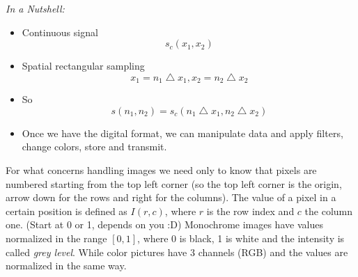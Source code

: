 \textit{In a Nutshell:}
\begin{itemize}
    \item Continuous signal \[ s_c(x_1, x_2)\]
    \item Spatial rectangular sampling \[ x_1 = n_1 \bigtriangleup x_1, x_2 = n_2 \bigtriangleup x_2\]
    \item So \[ s(n_1, n_2) = s_c(n_1 \bigtriangleup x_1, n_2 \bigtriangleup x_2)\]
    \item Once we have the digital format, we can manipulate data and apply filters, change colors, store and transmit.
\end{itemize}

For what concerns handling images we need only to know that pixels are numbered starting from the top left corner (so the top left corner is the origin, arrow down for the rows and right for the columns).
The value of a pixel in a certain position is defined as \(I(r,c)\), where \(r\) is the row index and \(c\) the column one. (Start at 0 or 1, depends on you :D)
Monochrome images have values normalized in the range \([0,1]\), where 0 is black, 1 is white and the intensity is called \textit{grey level}. While color pictures have 3 channels (RGB) and the values are normalized in the same way.
